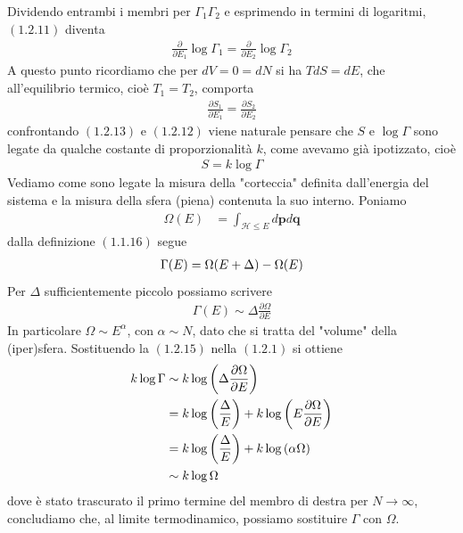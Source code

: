 \documentclass{article}
\begin{document}
Dividendo entrambi i membri per $\Gamma_1\Gamma_2$ e esprimendo in termini di logaritmi, $(1.2.11)$ diventa
\begin{gather}
    \frac{\partial}{\partial E_1}\log \Gamma_1 = \frac{\partial}{\partial E_2}\log \Gamma_2 \tag{1.2.12}
\end{gather}
A questo punto ricordiamo che per $dV = 0 = dN$ si ha $TdS = dE$, che all'equilibrio termico, cioè $T_1 = T_2$, comporta
\begin{gather}
    \frac{\partial S_1}{\partial E_1} = \frac{\partial S_2}{\partial E_2} \tag{1.2.13}
\end{gather}
confrontando $(1.2.13)$ e $(1.2.12)$ viene naturale pensare che $S$ e $\log\Gamma$ sono legate da qualche costante di proporzionalità $k$, come avevamo già ipotizzato, cioè
\begin{align*}
    S = k\log\Gamma
\end{align*}
Vediamo come sono legate la misura della "corteccia" definita dall'energia del sistema e la misura della sfera (piena) contenuta la suo interno. Poniamo
\begin{align}
    \Omega(E) &= \int_{\mathcal{H} \leq E}d\mathbf{p}d\mathbf{q} \tag{1.2.14}
\end{align}
dalla definizione $(1.1.16)$ segue
\begin{gather}
    \Gamma(E) = \Omega(E + \Delta) - \Omega(E) \notag
\end{gather}
Per $\Delta$ sufficientemente piccolo possiamo scrivere
\begin{gather}
    \Gamma(E) \sim \Delta\frac{\partial \Omega}{\partial E} \tag{1.2.15}
\end{gather}
In particolare $\Omega \sim E^\alpha$, con $\alpha \sim N$, dato che si tratta del "volume" della (iper)sfera. Sostituendo la $(1.2.15)$ nella $(1.2.1)$ si ottiene
\begin{align}
    k\log\Gamma &\sim k\log\left(\Delta\frac{\partial\Omega}{\partial E}\right) \notag \\
    &= k\log\left(\frac{\Delta}{E}\right) + k\log\left(E\frac{\partial\Omega}{\partial E}\right) \notag \\
    &= k\log\left(\frac{\Delta}{E}\right) + k\log\left(\alpha\Omega\right) \notag \\
    &\sim k\log\Omega \notag
\end{align}
dove è stato trascurato il primo termine del membro di destra per $N \rightarrow \infty$, concludiamo che, al limite termodinamico, possiamo sostituire $\Gamma$ con $\Omega$.
\end{document}
